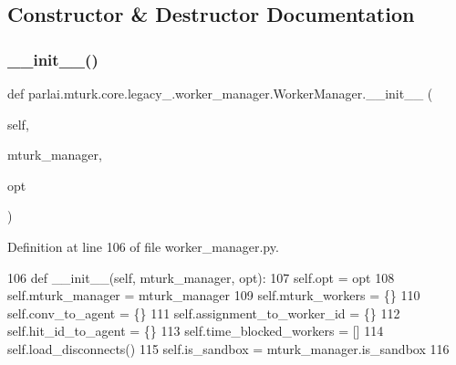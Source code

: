 \subsection{Constructor \& Destructor Documentation}
\mbox{\label{classparlai_1_1mturk_1_1core_1_1legacy__2018_1_1worker__manager_1_1WorkerManager_a24fab1ac6f3e46ac7e819cc2159cbd5b}} 
\subsubsection{\texorpdfstring{\+\_\+\+\_\+init\+\_\+\+\_\+()}{\_\_init\_\_()}}
{\footnotesize\ttfamily def parlai.\+mturk.\+core.\+legacy\+\_.\+worker\+\_\+manager.\+Worker\+Manager.\+\_\+\+\_\+init\+\_\+\+\_\+ (\begin{DoxyParamCaption}\item[{}]{self,  }\item[{}]{mturk\+\_\+manager,  }\item[{}]{opt }\end{DoxyParamCaption})}



Definition at line 106 of file worker\+\_\+manager.\+py.


\begin{DoxyCode}
106     \textcolor{keyword}{def }\_\_init\_\_(self, mturk\_manager, opt):
107         self.opt = opt
108         self.mturk\_manager = mturk\_manager
109         self.mturk\_workers = \{\}
110         self.conv\_to\_agent = \{\}
111         self.assignment\_to\_worker\_id = \{\}
112         self.hit\_id\_to\_agent = \{\}
113         self.time\_blocked\_workers = []
114         self.load\_disconnects()
115         self.is\_sandbox = mturk\_manager.is\_sandbox
116 
\end{DoxyCode}


